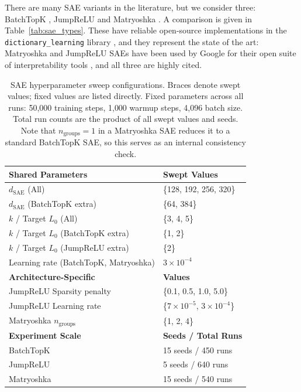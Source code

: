 There are many SAE variants in the literature, but we consider three: BatchTopK \cite{bussmann2024batchtopk}, JumpReLU \cite{rajamanoharan2024jumping} and Matryoshka \cite{bussmann2025learning}. A comparison is given in Table~\ref{tab:sae_types}.
These have reliable open-source implementations in the \texttt{dictionary\_learning} library \cite{marks2024dictionary_learning}, and they represent the state of the art: Matryoshka and JumpReLU SAEs have been used by Google for their open suite of interpretability tools \cite{lieberum2024gemma,mcdougall2025gemmascope2}, and all three are highly cited.


\begin{table}[ht]
\centering
\caption{
SAE hyperparameter sweep configurations. Braces denote swept values; fixed values are listed directly.
Fixed parameters across all runs: 50{,}000 training steps, 1{,}000 warmup steps, 4{,}096 batch size.
Total run counts are the product of all swept values and seeds. Note that $n_\text{groups}=1$ in a Matryoshka SAE reduces it to a standard BatchTopK SAE, so this serves as an internal consistency check.
}
\label{tab:sae_sweep_configs}
\begin{tabular}{ll}
\toprule
\textbf{Shared Parameters} & \textbf{Swept Values} \\
\midrule
$d_{\mathrm{SAE}}$ (All) & \{128, 192, 256, 320\} \\
$d_{\mathrm{SAE}}$ (BatchTopK extra) & \{64, 384\} \\
$k$ / Target $L_0$ (All) & \{3, 4, 5\} \\
$k$ / Target $L_0$ (BatchTopK extra) & \{1, 2\} \\
$k$ / Target $L_0$ (JumpReLU extra) & \{2\} \\
Learning rate (BatchTopK, Matryoshka) & $3\!\times\!10^{-4}$ \\
\midrule
\textbf{Architecture-Specific} & \textbf{Values} \\
\midrule
JumpReLU Sparsity penalty & \{0.1, 0.5, 1.0, 5.0\} \\
JumpReLU Learning rate & \{$7\!\times\!10^{-5}$, $3\!\times\!10^{-4}$\} \\
Matryoshka $n_{\text{groups}}$ & \{1, 2, 4\} \\
\midrule
\textbf{Experiment Scale} & \textbf{Seeds / Total Runs} \\
\midrule
BatchTopK & 15 seeds / 450 runs \\
JumpReLU & 5 seeds / 640 runs \\
Matryoshka & 15 seeds / 540 runs \\
\bottomrule
\end{tabular}
\end{table}


